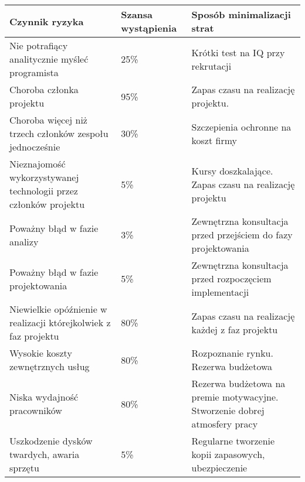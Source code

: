 \documentclass[11pt,leqno]{article}
\begin{document}
\vspace{1 cm}
\hspace{-1.5cm}
 \begin{tabular}{|p{6cm}|p{1.3cm}|p{6cm}|}
  \hline
 Czynnik ryzyka & Szansa wystąpienia & Sposób minimalizacji strat \\ \hline
  Nie potrafiący analitycznie myśleć programista & 25\% & Krótki test na IQ przy rekrutacji \\ \hline
 Choroba członka projektu & 95\% & Zapas czasu na realizację projektu. \\ \hline
 Choroba więcej niż trzech członków zespołu jednocześnie & 30\% & Szczepienia ochronne na koszt firmy \\ \hline
 Nieznajomość wykorzystywanej technologii przez członków  projektu & 5\% & Kursy doszkalające. Zapas czasu na realizację projektu \\ \hline
Poważny błąd w fazie analizy & 3\% & Zewnętrzna konsultacja przed przejściem do fazy projektowania \\ \hline
Poważny błąd w fazie projektowania & 5\% & Zewnętrzna konsultacja przed rozpoczęciem implementacji \\ \hline
Niewielkie opóźnienie w realizacji którejkolwiek z faz projektu & 80\% & Zapas czasu na realizację każdej z faz projektu \\ \hline
Wysokie koszty zewnętrznych usług & 80\% & Rozpoznanie rynku. Rezerwa budżetowa \\ \hline
Niska wydajność pracowników & 80\% & Rezerwa budżetowa na premie motywacyjne. Stworzenie dobrej atmosfery pracy \\ \hline
Uszkodzenie dysków twardych, awaria sprzętu & 5\% & Regularne tworzenie kopii zapasowych, ubezpieczenie \\ \hline
 \end{tabular}
\end{document}
